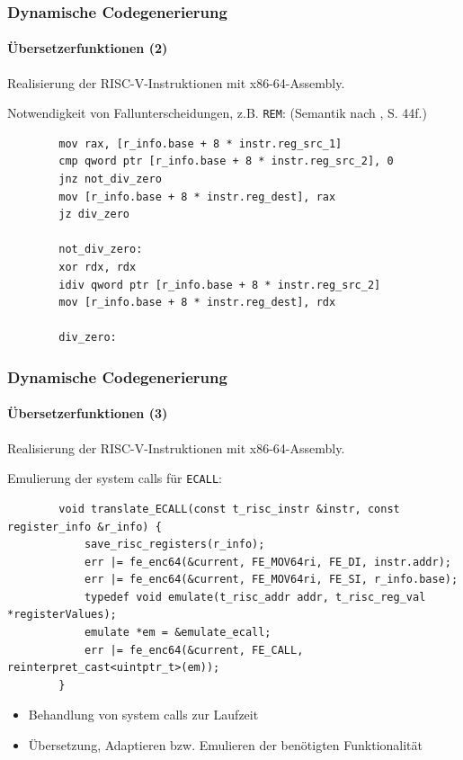 \documentclass[german]{tum-presentation}
\begin{document}
\begin{frame}[fragile]
	\frametitle{Dynamische Codegenerierung}
	\framesubtitle{Übersetzerfunktionen (2)}
	
	Realisierung der RISC-V-Instruktionen mit x86-64-Assembly.
	
	\vspace{0.3cm}
	Notwendigkeit von Fallunterscheidungen, z.B. \verb!REM!: (Semantik nach , S. 44f.)
	\pause
	\begin{verbatim}
		mov rax, [r_info.base + 8 * instr.reg_src_1]
		cmp qword ptr [r_info.base + 8 * instr.reg_src_2], 0
		jnz not_div_zero
		mov [r_info.base + 8 * instr.reg_dest], rax
		jz div_zero
		
		not_div_zero:
		xor rdx, rdx
		idiv qword ptr [r_info.base + 8 * instr.reg_src_2]
		mov [r_info.base + 8 * instr.reg_dest], rdx
		
		div_zero:
	\end{verbatim}
\end{frame}

\begin{frame}[fragile]
	\frametitle{Dynamische Codegenerierung}
	\framesubtitle{Übersetzerfunktionen (3)}
	
	Realisierung der RISC-V-Instruktionen mit x86-64-Assembly.
	
	\vspace{0.3cm}
	Emulierung der system calls für \verb!ECALL!:
	\pause
	\begin{lstlisting}
		void translate_ECALL(const t_risc_instr &instr, const register_info &r_info) {
			save_risc_registers(r_info);
			err |= fe_enc64(&current, FE_MOV64ri, FE_DI, instr.addr);
			err |= fe_enc64(&current, FE_MOV64ri, FE_SI, r_info.base);
			typedef void emulate(t_risc_addr addr, t_risc_reg_val *registerValues);
			emulate *em = &emulate_ecall;
			err |= fe_enc64(&current, FE_CALL, reinterpret_cast<uintptr_t>(em));
		}
	\end{lstlisting}
	
	\begin{itemize}
		\item Behandlung von system calls zur Laufzeit
		\item Übersetzung, Adaptieren bzw. Emulieren der benötigten Funktionalität
	\end{itemize}
\end{frame}
\end{document}
